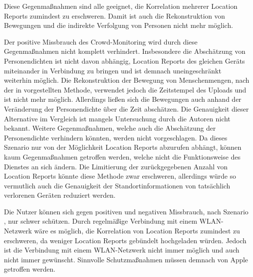 Diese Gegenmaßnahmen sind alle geeignet, die Korrelation mehrerer Location Reports zumindest zu erschweren.
Damit ist auch die Rekonstruktion von Bewegungen und die indirekte Verfolgung von Personen nicht mehr möglich. 

Der positive Missbrauch des Crowd-Monitoring wird durch diese Gegenmaßnahmen nicht komplett verhindert.
Insbesondere die Abschätzung von Personendichten ist nicht davon abhängig, Location Reports des gleichen Geräts miteinander in Verbindung zu bringen und ist demnach uneingeschränkt weiterhin möglich.
Die Rekonstruktion der Bewegung von Menschenmengen, nach der in \cite{Tonetto_FindMy} vorgestellten Methode, verwendet jedoch die Zeitstempel des Uploads und ist nicht mehr möglich.
Allerdings ließen sich die Bewegungen auch anhand der Veränderung der Personendichte über die Zeit abschätzen.
Die Genauigkeit dieser Alternative im Vergleich ist mangels Untersuchung durch die Autoren nicht bekannt.
Weitere Gegenmaßnahmen, welche auch die Abschätzung der Personendichte verhindern könnten, werden nicht vorgeschlagen.
Da dieses Szenario nur von der Möglichkeit Location Reports abzurufen abhängt, können kaum Gegenmaßnahmen getroffen werden, welche nicht die Funktionsweise des Dienstes an sich ändern.
Die Limitierung der zurückgegebenen Anzahl von Location Reports könnte diese Methode zwar erschweren, allerdings würde so vermutlich auch die Genauigkeit der Standortinformationen von tatsächlich verlorenen Geräten reduziert werden.

Die Nutzer können sich gegen positiven und negativen Missbrauch, nach Szenario , nur schwer schützen.
Durch regelmäßige Verbindung mit einem WLAN-Netzwerk wäre es möglich, die Korrelation von Location Reports zumindest zu erschweren, da weniger Location Reports gebündelt hochgeladen würden. 
Jedoch ist die Verbindung mit einem WLAN-Netzwerk nicht immer möglich und auch nicht immer gewünscht.
Sinnvolle Schutzmaßnahmen müssen demnach von Apple getroffen werden.


